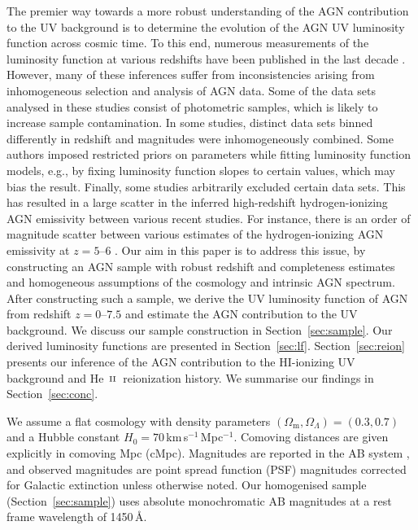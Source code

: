 \documentclass[fleqn,usenatbib]{mnras}
\def\nHI{{\rm HI}}
\def\HeII{\hbox{He~$\scriptstyle\rm II$}}
\begin{document}
The premier way towards a more robust understanding of the AGN
contribution to the UV background is to determine the evolution of the
AGN UV luminosity function across cosmic time.  To this end, numerous
measurements of the luminosity function at various redshifts have been
published in the last decade \citep{2009A&A...507..781S,
  2009MNRAS.392...19C, 2010AJ....139..906W, 2011ApJ...728L..26G,
  2012ApJ...755..169M, 2013ApJ...773...14R, 2013ApJ...768..105M,
  2015AA...578A..83G, 2016ApJ...833..222J, 2016ApJ...829...33Y,
  2016A&A...587A..41P, 2017ApJ...847L..15O, 2018PASJ...70S..34A,
  2018AJ....155..131M}.  However, many of these inferences suffer from
inconsistencies arising from inhomogeneous selection and analysis of AGN
data.  Some of the data sets analysed in these studies consist of
photometric samples, which is likely to increase sample contamination.
In some studies, distinct data sets binned differently in redshift and
magnitudes were inhomogeneously combined.  Some authors imposed
restricted priors on parameters while fitting luminosity function
models, e.g., by fixing luminosity function slopes to certain values,
which may bias the result.  Finally, some studies arbitrarily excluded
certain data sets.  This has resulted in a large scatter in the
inferred high-redshift hydrogen-ionizing AGN emissivity between
various recent studies.  For instance, there is an order of magnitude
scatter between various estimates of the hydrogen-ionizing AGN
emissivity at $z=5$--$6$ \citep{2011ApJ...728L..26G,
  2012ApJ...755..169M, 2015AA...578A..83G, 2018PASJ...70S..34A,
  2018AJ....155..131M, 2018MNRAS.474.2904P, 2017ApJ...847L..15O}.  Our
aim in this paper is to address this issue, by constructing an AGN
sample with robust redshift and completeness estimates and homogeneous
assumptions of the cosmology and intrinsic AGN spectrum.  After
constructing such a sample, we derive the UV luminosity function of
AGN from redshift $z=0$--$7.5$ and estimate the AGN contribution to
the UV background.  We discuss our sample construction in
Section~\ref{sec:sample}.  Our derived luminosity functions are
presented in Section~\ref{sec:lf}.  Section~\ref{sec:reion} presents
our inference of the AGN contribution to the \nHI-ionizing UV
background and \HeII\ reionization history.  We summarise our findings
in Section~\ref{sec:conc}.

We assume a flat cosmology with density parameters
$\left(\Omega_\mathrm{m},\Omega_\Lambda\right)=\left(0.3,0.7\right)$
and a Hubble constant $H_0=70$\,km\,s$^{-1}$\,Mpc$^{-1}$. Comoving
distances are given explicitly in comoving Mpc (cMpc). Magnitudes
are reported in the AB system \citep{1983ApJ...266..713O}, and
observed magnitudes are point spread function (PSF) magnitudes
\citep{2002AJ....123..485S} corrected for Galactic extinction
\citep{1998ApJ...500..525S} unless otherwise noted.
Our homogenised sample (Section~\ref{sec:sample}) uses absolute
monochromatic AB magnitudes at a rest frame wavelength of 1450\,\AA.
\end{document}
